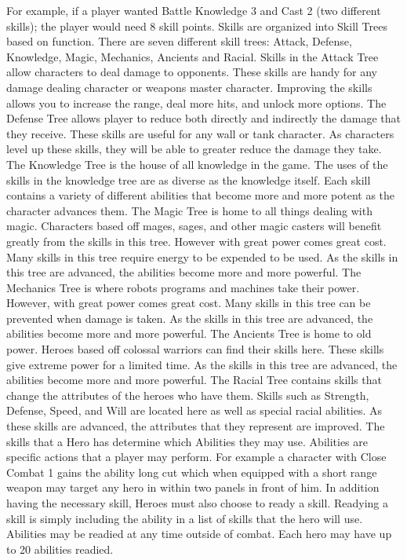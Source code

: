 For example, if a player wanted Battle Knowledge 3 and Cast 2 (two different
skills); the player would need 8 skill points.  Skills are organized into Skill
Trees based on function.  There are seven different skill trees:
Attack, Defense, Knowledge, Magic, Mechanics, Ancients and Racial.  Skills in the
Attack Tree allow characters to deal damage to opponents.  These skills are
handy for any damage dealing character or weapons master character.  Improving
the skills allows you to increase the range, deal more hits, and unlock more
options.  The Defense Tree allows player to reduce both directly and indirectly
the damage that they receive.  These skills are useful for any wall or tank
character.  As characters level up these skills, they will be able to greater
reduce the damage they take.  The Knowledge Tree is the house of all knowledge
in the game.  The uses of the skills in the knowledge tree are as diverse as
the knowledge itself.  Each skill contains a variety of different abilities
that become more and more potent as the character advances them.  The Magic
Tree is home to all things dealing with magic.  Characters based off
mages, sages, and other magic casters will benefit greatly from the skills in
this tree.  However with great power comes great cost.  Many skills in this
tree require energy to be expended to be used.  As the skills in this tree are
advanced, the abilities become more and more powerful.  The Mechanics Tree is
where robots programs and machines take their power.  However, with great power
comes great cost.  Many skills in this tree can be prevented when damage is
taken.  As the skills in this tree are advanced, the abilities become more and
more powerful.  The Ancients Tree is home to old power.  Heroes based off
colossal warriors can find their skills here.  These skills give extreme power
for a limited time.  As the skills in this tree are advanced, the abilities
become more and more powerful.  The Racial Tree contains skills that change the
attributes of the heroes who have them.  Skills such as
Strength, Defense, Speed, and Will are located here as well as special racial
abilities.  As these skills are advanced, the attributes that they represent are
improved.  The skills that a Hero has determine which Abilities they may use.
Abilities are specific actions that a player may perform.  For example a
character with Close Combat 1 gains the ability long cut which when equipped
with a short range weapon may target any hero in within two panels in front of
him.  In addition having the necessary skill, Heroes must also choose to ready a
skill.  Readying a skill is simply including the ability in a list of skills
that the hero will use.  Abilities may be readied at any time outside of
combat.  Each hero may have up to 20 abilities readied.

